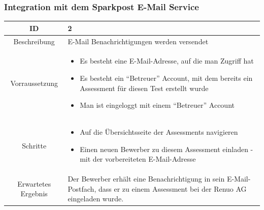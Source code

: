 \subsubsection{Integration mit dem Sparkpost E-Mail Service}
\begin{tabularx}{\textwidth}[H]{|c|X|}
    \hline
    ID & 2 \\ 
    \hline

    Beschreibung &
    E-Mail Benachrichtigungen werden versendet
    \\ \hline

    Vorraussetzung &
    \begin{itemize}
        \item Es besteht eine E-Mail-Adresse, auf die man Zugriff hat
        \item Es besteht ein \enquote{Betreuer} Account, mit dem bereits ein Assessment für diesen Test erstellt wurde
        \item Man ist eingeloggt mit einem \enquote{Betreuer} Account
    \end{itemize}
    \\ \hline

    Schritte & 
    \begin{itemize}
        \item Auf die Übersichtsseite der Assessments navigieren
        \item Einen neuen Bewerber zu diesem Assessment einladen - mit der vorbereiteten E-Mail-Adresse
    \end{itemize}
    \\ \hline

    Erwartetes Ergebnis &
    Der Bewerber erhält eine Benachrichtigung in sein E-Mail-Postfach, dass er zu einem Assessment bei der Renuo AG eingeladen wurde.
    \\ \hline
\end{tabularx}

